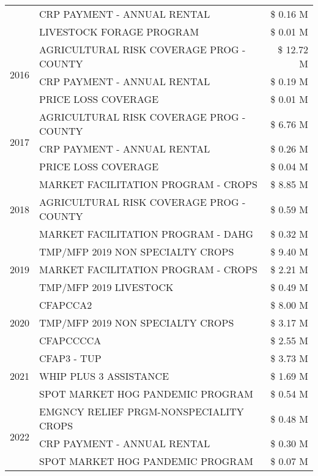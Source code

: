 \begin{tabular}{llr}
 & CRP PAYMENT - ANNUAL RENTAL & \$ 0.16 M \\
 & LIVESTOCK FORAGE PROGRAM & \$ 0.01 M \\
\cline{1-3}
\multirow[t]{3}{*}{2016} & AGRICULTURAL RISK COVERAGE PROG - COUNTY & \$ 12.72 M \\
 & CRP PAYMENT - ANNUAL RENTAL & \$ 0.19 M \\
 & PRICE LOSS COVERAGE & \$ 0.01 M \\
\cline{1-3}
\multirow[t]{3}{*}{2017} & AGRICULTURAL RISK COVERAGE PROG - COUNTY & \$ 6.76 M \\
 & CRP PAYMENT - ANNUAL RENTAL & \$ 0.26 M \\
 & PRICE LOSS COVERAGE & \$ 0.04 M \\
\cline{1-3}
\multirow[t]{3}{*}{2018} & MARKET FACILITATION PROGRAM - CROPS & \$ 8.85 M \\
 & AGRICULTURAL RISK COVERAGE PROG - COUNTY & \$ 0.59 M \\
 & MARKET FACILITATION PROGRAM - DAHG & \$ 0.32 M \\
\cline{1-3}
\multirow[t]{3}{*}{2019} & TMP/MFP 2019 NON SPECIALTY CROPS & \$ 9.40 M \\
 & MARKET FACILITATION PROGRAM - CROPS & \$ 2.21 M \\
 & TMP/MFP 2019 LIVESTOCK & \$ 0.49 M \\
\cline{1-3}
\multirow[t]{3}{*}{2020} & CFAPCCA2 & \$ 8.00 M \\
 & TMP/MFP 2019 NON SPECIALTY CROPS & \$ 3.17 M \\
 & CFAPCCCCA & \$ 2.55 M \\
\cline{1-3}
\multirow[t]{3}{*}{2021} & CFAP3 - TUP & \$ 3.73 M \\
 & WHIP PLUS 3 ASSISTANCE & \$ 1.69 M \\
 & SPOT MARKET HOG PANDEMIC PROGRAM & \$ 0.54 M \\
\cline{1-3}
\multirow[t]{3}{*}{2022} & EMGNCY RELIEF PRGM-NONSPECIALITY CROPS & \$ 0.48 M \\
 & CRP PAYMENT - ANNUAL RENTAL & \$ 0.30 M \\
 & SPOT MARKET HOG PANDEMIC PROGRAM & \$ 0.07 M \\
\cline{1-3}
\bottomrule
\end{tabular}
